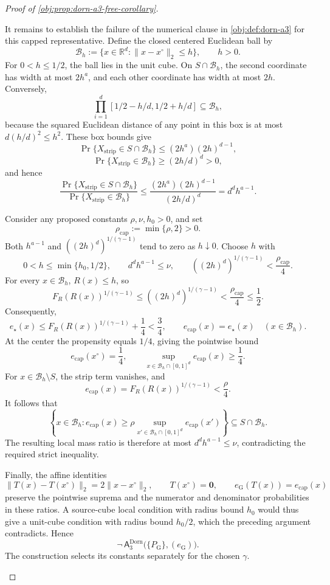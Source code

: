 \begin{proof}[Proof of \cref{obj:prop:dorn-a3-free-corollary}]
\begin{enumerate}
It remains to establish the failure of the numerical clause in
\cref{obj:def:dorn-a3} for this capped representative. Define the closed centered Euclidean ball by
\[
\mathcal B_h:=
\{x\in\mathbb R^d:\|x-x^\circ\|_2\le h\},
\qquad h>0.
\]
For \(0<h\le1/2\), the ball lies in the unit cube. On
\(S\cap\mathcal B_h\), the second coordinate has width at most \(2h^a\), and each other coordinate has width at most \(2h\). Conversely,
\[
\prod_{i=1}^d[1/2-h/d,1/2+h/d]\subseteq\mathcal B_h,
\]
because the squared Euclidean distance of any point in this box is at most
\(d(h/d)^2\le h^2\). These box bounds give
\[
\Pr\{X_{\mathrm{strip}}\in S\cap\mathcal B_h\}
\le (2h^a)(2h)^{d-1},
\]
\[
\Pr\{X_{\mathrm{strip}}\in\mathcal B_h\}
\ge (2h/d)^d>0,
\]
and hence
\[
\frac{\Pr\{X_{\mathrm{strip}}\in S\cap\mathcal B_h\}}
{\Pr\{X_{\mathrm{strip}}\in\mathcal B_h\}}
\le
\frac{(2h^a)(2h)^{d-1}}{(2h/d)^d}
=
d^d h^{a-1}.
\]

Consider any proposed constants \(\rho,\nu,h_0>0\), and set
\[
\rho_{\mathrm{cap}}:=\min\{\rho,2\}>0.
\]
Both \(h^{a-1}\) and \(((2h)^d)^{1/(\gamma-1)}\) tend to zero as \(h\downarrow0\). Choose \(h\) with
\[
0<h\le\min\{h_0,1/2\},
\qquad
d^d h^{a-1}\le\nu,
\qquad
((2h)^d)^{1/(\gamma-1)}
<
\frac{\rho_{\mathrm{cap}}}{4}.
\]
For every \(x\in\mathcal B_h\), \(R(x)\le h\), so
\[
F_R(R(x))^{1/(\gamma-1)}
\le ((2h)^d)^{1/(\gamma-1)}
<
\frac{\rho_{\mathrm{cap}}}{4}
\le\frac12.
\]
Consequently,
\[
e_\star(x)
\le F_R(R(x))^{1/(\gamma-1)}+\frac14
<\frac34,
\qquad
e_{\mathrm{cap}}(x)=e_\star(x)
\quad(x\in\mathcal B_h).
\]
At the center the propensity equals \(1/4\), giving the pointwise bound
\[
e_{\mathrm{cap}}(x^\circ)=\frac14,
\qquad
\sup_{x\in\mathcal B_h\cap[0,1]^d}e_{\mathrm{cap}}(x)\ge\frac14.
\]
For \(x\in\mathcal B_h\setminus S\), the strip term vanishes, and
\[
e_{\mathrm{cap}}(x)
=
F_R(R(x))^{1/(\gamma-1)}
<\frac{\rho}{4}.
\]
It follows that
\[
\left\{
x\in\mathcal B_h:
e_{\mathrm{cap}}(x)\ge
\rho\sup_{x'\in\mathcal B_h\cap[0,1]^d}e_{\mathrm{cap}}(x')
\right\}
\subseteq S\cap\mathcal B_h.
\]
The resulting local mass ratio is therefore at most
\(d^d h^{a-1}\le\nu\), contradicting the required strict inequality.

Finally, the affine identities
\[
\|T(x)-T(x^\circ)\|_2=2\|x-x^\circ\|_2,
\qquad
T(x^\circ)=\mathbf0,
\qquad
e_{\mathrm G}(T(x))=e_{\mathrm{cap}}(x)
\]
preserve the pointwise suprema and the numerator and denominator probabilities in these ratios. A source-cube local condition with radius bound \(h_0\) would thus give a unit-cube condition with radius bound \(h_0/2\), which the preceding argument contradicts. Hence
\[
\neg\,\mathsf A_3^{\mathrm{Dorn}}
\bigl(\{P_{\mathrm G}\},(e_{\mathrm G})\bigr).
\]
The construction selects its constants separately for the chosen \(\gamma\).


\end{enumerate}
\end{proof}
